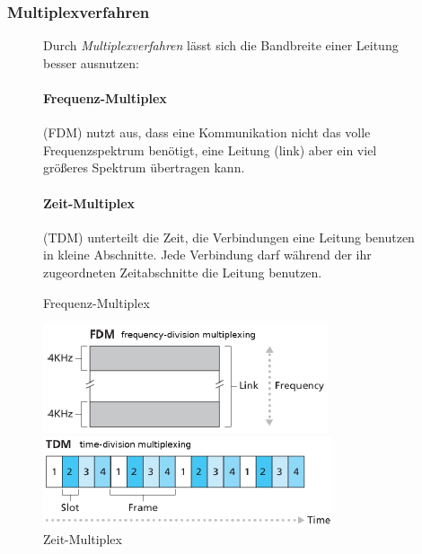 \documentclass[12pt]{report}
\begin{document}
\subsubsection{Multiplexverfahren}
\begin{figure}[H]
  \begin{minipage}[t]{0.45\textwidth}
    Durch \textit{Multiplexverfahren} lässt sich die Bandbreite einer Leitung besser ausnutzen:
    
    \paragraph{Frequenz-Multiplex} (FDM) nutzt aus, dass eine Kommunikation nicht das volle Frequenzspektrum benötigt, 
    eine Leitung (link) aber ein viel größeres Spektrum übertragen kann.
    
    \paragraph{Zeit-Multiplex} (TDM) unterteilt die Zeit, die Verbindungen eine Leitung benutzen in kleine Abschnitte. 
    Jede Verbindung darf während der ihr zugeordneten Zeitabschnitte die Leitung benutzen.
    
  \end{minipage}
  \hfill
  \begin{minipage}[t]{0.45\textwidth}
    \caption{Frequenz-Multiplex}
    \label{fig:frequenz-multiplex}
    \begin{center}
      \includegraphics{frequenz-multiplex}
    \end{center}
    
    
    \caption{Zeit-Multiplex}
    \label{fig:zeit-multiplex}
    \begin{center}
      \includegraphics{zeit-multiplex}
    \end{center}
  \end{minipage}
\end{figure}
\end{document}
